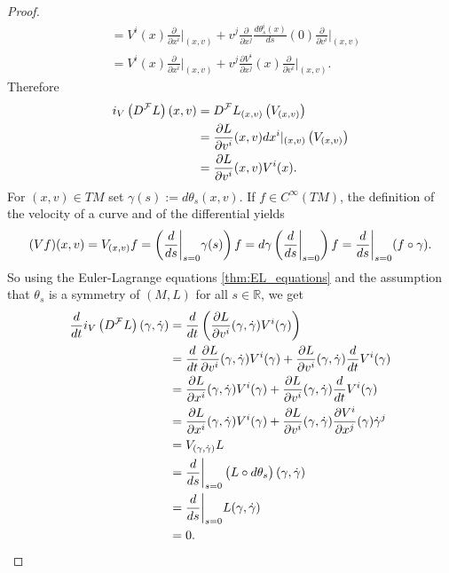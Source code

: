 \begin{proof}
\begin{align*}
		&= V^i(x)\frac{\partial}{\partial x^i}\bigg\vert_{(x,v)} + v^j\frac{\partial}{\partial x^j} \frac{d \theta_s^i(x)}{ds}(0) \frac{\partial}{\partial v^i}\bigg\vert_{(x,v)}\\
		&= V^i(x)\frac{\partial}{\partial x^i}\bigg\vert_{(x,v)} + v^j\frac{\partial V^i}{\partial x^j}(x) \frac{\partial}{\partial v^i}\bigg\vert_{(x,v)}.
	\end{align*}
	Therefore
	\begin{align*}
		i_V\del[1]{D^\mathcal{F}L}(x,v) &= D^\mathcal{F}L_{(x,v)}\del[1]{V_{(x,v)}}\\
		&= \frac{\partial L}{\partial v^i}(x,v)dx^i\vert_{(x,v)}\del[1]{V_{(x,v)}}\\
		&= \frac{\partial L}{\partial v^i}(x,v) V^i(x).
	\end{align*}
	For $(x,v) \in TM$ set $\gamma(s) := d\theta_s(x,v)$. If $f \in C^\infty(TM)$, the definition of the velocity of a curve and of the differential yields
	\begin{equation*}
		(Vf)(x,v) = V_{(x,v)}f = \del[3]{\frac{d}{ds}\bigg\vert_{s = 0}\gamma(s)}f= d\gamma\del[3]{\frac{d}{ds}\bigg\vert_{s = 0}}f = \frac{d}{ds}\bigg\vert_{s = 0}(f \circ \gamma).
	\end{equation*}
	So using the Euler-Lagrange equations \ref{thm:EL_equations} and the assumption that $\theta_s$ is a symmetry of $(M,L)$ for all $s \in \mathbb{R}$, we get
	\begin{align*}
		\frac{d}{dt}i_V\del[1]{D^\mathcal{F}L}(\gamma,\dot{\gamma}) &= \frac{d}{dt}\del[3]{\frac{\partial L}{\partial v^i}(\gamma,\dot{\gamma}) V^i(\gamma)}\\
		&= \frac{d}{dt}\frac{\partial L}{\partial v^i}(\gamma,\dot{\gamma}) V^i(\gamma) + \frac{\partial L}{\partial v^i}(\gamma,\dot{\gamma}) \frac{d}{dt}V^i(\gamma)\\
		&= \frac{\partial L}{\partial x^i}(\gamma,\dot{\gamma}) V^i(\gamma) + \frac{\partial L}{\partial v^i}(\gamma,\dot{\gamma}) \frac{d}{dt}V^i(\gamma)\\
		&= \frac{\partial L}{\partial x^i}(\gamma,\dot{\gamma}) V^i(\gamma) + \frac{\partial L}{\partial v^i}(\gamma,\dot{\gamma}) \frac{\partial V^i}{\partial x^j}(\gamma)\dot{\gamma}^j\\
		&= V_{(\gamma,\dot{\gamma})}L\\
		&= \frac{d}{ds}\bigg\vert_{s = 0} \del[1]{L \circ d\theta_s}(\gamma,\dot{\gamma})\\
		&= \frac{d}{ds}\bigg\vert_{s = 0} L(\gamma,\dot{\gamma})\\
		&= 0.
	\end{align*}
\end{proof}
